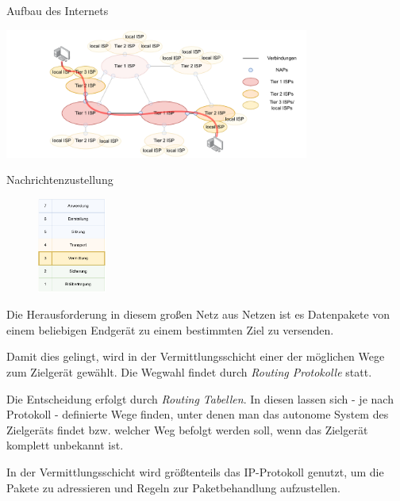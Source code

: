 \begin{bonus}{Aufbau des Internets}
    \begin{center}
        \includegraphics[width=0.75\textwidth]{includes/figures/bonus_aufbau_internet_4.pdf}
    \end{center}
\end{bonus}

\begin{bonus}{Nachrichtenzustellung}
    \begin{figure}
        \begin{center}
            \includegraphics[width=0.2\textwidth]{includes/figures/bonus_iso_osi_vermittlung.pdf}
        \end{center}
    \end{figure}
    Die Herausforderung in diesem großen Netz aus Netzen ist es Datenpakete von einem beliebigen Endgerät zu einem bestimmten Ziel zu versenden.

    Damit dies gelingt, wird in der Vermittlungsschicht einer der möglichen Wege zum Zielgerät gewählt.
    Die Wegwahl findet durch \emph{Routing Protokolle} statt.

    Die Entscheidung erfolgt durch \emph{Routing Tabellen}.
    In diesen lassen sich - je nach Protokoll - definierte Wege finden, unter denen man das autonome System des Zielgeräts findet bzw. welcher Weg befolgt werden soll, wenn das Zielgerät komplett unbekannt ist.

    In der Vermittlungsschicht wird größtenteils das IP-Protokoll genutzt, um die Pakete zu adressieren und Regeln zur Paketbehandlung aufzustellen.
\end{bonus}

